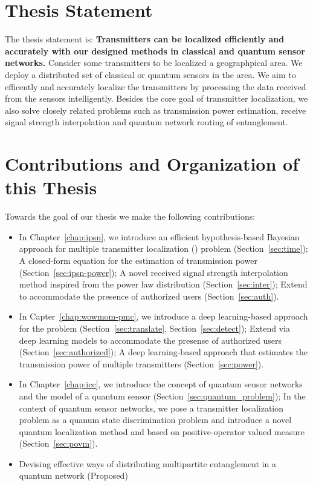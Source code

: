 \section{Thesis Statement}

The thesis statement is: \textbf{Transmitters can be localized efficiently and accurately with our designed methods in classical and quantum sensor networks.} 
Consider some transmitters to be localized a geographpical area. We deploy a distributed set of classical or quantum sensors in the area.
We aim to efficently and accurately localize the transmitters by processing the data received from the sensors intelligently.
Besides the core goal of transmitter localization, we also solve closely related problems such as transmission power estimation, 
receive signal strength interpolation and quantum network routing of entanglement.

\section{Contributions and Organization of this Thesis}

Towards the goal of our thesis we make the following contributions:

\begin{itemize}
    \item In Chapter~\ref{chap:ipsn}, we introduce an efficient hypothesis-based Bayesian approach \ouralgo for multiple transmitter localization (\mtl) problem (Section~\ref{sec:time}); 
          A closed-form equation for the estimation of transmission power (Section~\ref{sec:ipsn-power});
          A novel received signal strength interpolation method inspired from the power law distribution (Section~\ref{sec:inter});
          Extend \ouralgo to accommodate the presence of authorized users (Section~\ref{sec:auth}).
    \item In Capter~\ref{chap:wowmom-pmc}, we introduce a deep learning-based approach \our for the \mtl problem (Section~\ref{sec:translate}, Section~\ref{sec:detect});
          Extend \our via deep learning models to accommodate the presense of authorized users (Section~\ref{sec:authorized});
          A deep learning-based approach that estimates the transmission power of multiple transmitters (Section~\ref{sec:power}).
    \item In Chapter~\ref{chap:icc}, we introduce the concept of quantum sensor networks and the model of a quantum sensor (Section~\ref{sec:quantum_problem});
          In the context of quantum sensor networks, we pose a transmitter localization problem as a quanum state discrimination problem 
          and introduce a novel quantum localization method \povm and \povmpro based on positive-operator valued measure (Section~\ref{sec:povm}).
    \item Devising effective ways of distributing multipartite entanglement in a quantum network (Proposed)
\end{itemize}

